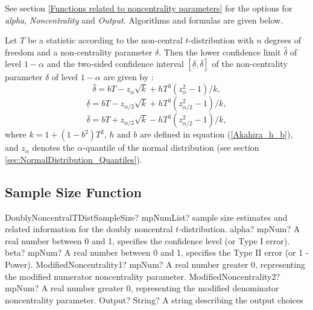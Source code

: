 \vspace{0.3cm}
See section \ref{Functions related to noncentrality parameters} for the options for  {\itshape\sffamily alpha}, {\itshape\sffamily Noncentrality} and {\itshape\sffamily Output}. Algorithms and formulas are given below.

\vspace{0.3cm}
Let $T$ be a statistic according to the non-central $t$-distribution
with $n$ degrees of freedom and a non-centrality parameter $\delta$. Then
the lower confidence limit $\widehat{\delta}$ of level $1-\alpha$ and the two-sided confidence interval $[ \underline{\delta},\overline{\delta}]$ of the
non-centrality parameter $\delta$ of level $1-\alpha$ are given by \cite{akahira_1995}:
\begin{equation}
	\widehat{\delta} = bT - z_\alpha \sqrt{k} +  h T^3 (z_\alpha^2 - 1)/k,
\end{equation} 
\begin{equation}
	\underline{\delta} = bT - z_{\alpha/2} \sqrt{k} +  h T^3 (z_{\alpha/2}^2 - 1)/k,
\end{equation} 
\begin{equation}
	\overline{\delta} = bT + z_{\alpha/2} \sqrt{k} -  h T^3 (z_{\alpha/2}^2 - 1)/k,
\end{equation} 
where $k=1+(1-b^2)T^2$, $h$ and $b$ are defined in equation (\ref{Akahira_h_b}), and $z_\alpha$ denotes the $\alpha$-quantile of the normal distribution (see section \ref{sec:NormalDistribution_Quantiles}).





\subsection{Sample Size Function}
\label{DoublyNoncentralTDistributionSampleSize}

\begin{mpFunctionsExtract}
	\mpFunctionFiveNotImplemented
	{DoublyNoncentralTDistSampleSize? mpNumList? sample size estimates and related information for the doubly noncentral $t$-distribution.}
	{alpha? mpNum? A real number between 0 and 1, specifies the confidence level (or Type I error).}
	{beta? mpNum?  A real number between 0 and 1, specifies the Type II error (or 1 - Power).}
	{ModifiedNoncentrality1? mpNum? A real number greater 0, representing the modified numerator noncentrality parameter.}
	{ModifiedNoncentrality2? mpNum? A real number greater 0, representing the modified denominator noncentrality parameter.}
	{Output? String? A string describing the output choices}
\end{mpFunctionsExtract}

